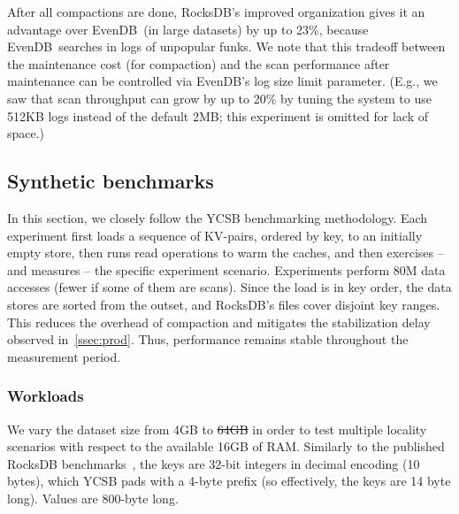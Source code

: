 \documentclass[sigplan,10pt]{acmart}
\newcommand{\inred}[1]{{\color{red}{#1}}}
\newcommand{\sys}{EvenDB}
\providecommand{\DIFadd}[1]{{\protect\color{blue}\uwave{#1}}} %
\providecommand{\DIFdel}[1]{{\protect\color{red}\sout{#1}}}                      %
\providecommand{\DIFaddbegin}{} %
\providecommand{\DIFaddend}{} %
\providecommand{\DIFdelbegin}{} %
\providecommand{\DIFdelend}{} %
\begin{document}
After all compactions are done, RocksDB's improved organization gives it an advantage  over \sys\
(in large datasets) by up to 23\%, because \sys\ searches
in  logs of unpopular funks. We note that this tradeoff between the maintenance cost (for compaction) 
and the scan performance after maintenance  can be controlled via \sys's log size limit parameter.
(E.g., we saw that scan throughput can  grow by up to 20\%  by tuning the system to use 512KB logs instead of
the default 2MB; this experiment is omitted for lack of space.)





\subsection{Synthetic benchmarks}
\label{ssec:synthetic} 


In this section, we closely follow the YCSB benchmarking methodology. 
Each experiment first  loads a sequence of KV-pairs, ordered by key, to an initially empty store, then  
runs read operations to warm the caches, and then exercises -- and measures --  the specific experiment 
scenario. Experiments perform 80M data accesses (fewer if some of them are scans). 
Since the load is in key order, the data stores are sorted from the outset, and RocksDB's files cover disjoint key ranges. 
This reduces the overhead of compaction and mitigates the stabilization delay observed in~\cref{ssec:prod}.  Thus, 
performance remains stable throughout the measurement period.

\subsubsection{Workloads}

We vary the dataset size from 4GB to \DIFdelbegin \DIFdel{64GB }\DIFdelend \DIFaddbegin \DIFadd{256GB }\DIFaddend in order to test multiple locality 
scenarios with respect to the available 16GB of RAM. Similarly to the published RocksDB benchmarks~\cite{RocksDBPerf}, 
the keys are 32-bit integers in decimal encoding (10 bytes), which YCSB pads with a 4-byte prefix (so effectively, 
the keys are 14 byte long). Values are 800-byte long. 
\end{document}
